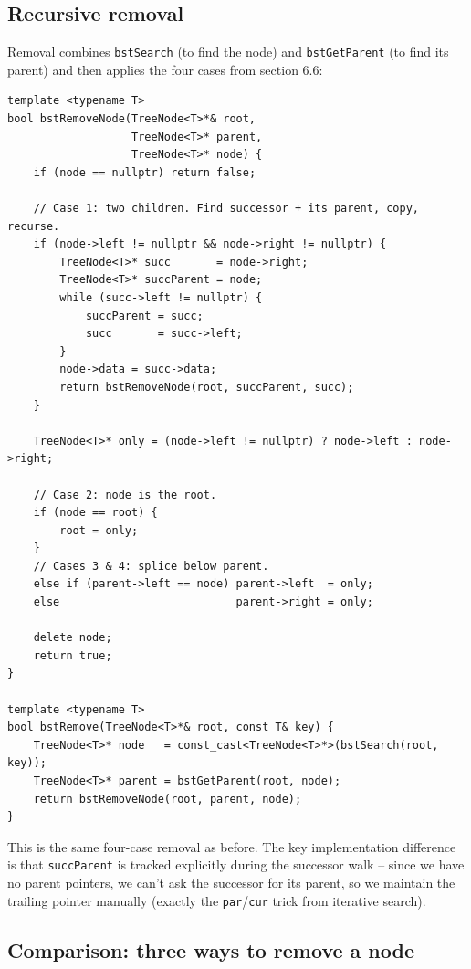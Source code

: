 \documentclass[11pt]{article}
\begin{document}
\subsection*{Recursive removal}

Removal combines \texttt{bstSearch} (to find the node) and \texttt{bstGetParent} (to find its parent) and then applies the four cases from section 6.6:

\begin{lstlisting}
template <typename T>
bool bstRemoveNode(TreeNode<T>*& root,
                   TreeNode<T>* parent,
                   TreeNode<T>* node) {
    if (node == nullptr) return false;

    // Case 1: two children. Find successor + its parent, copy, recurse.
    if (node->left != nullptr && node->right != nullptr) {
        TreeNode<T>* succ       = node->right;
        TreeNode<T>* succParent = node;
        while (succ->left != nullptr) {
            succParent = succ;
            succ       = succ->left;
        }
        node->data = succ->data;
        return bstRemoveNode(root, succParent, succ);
    }

    TreeNode<T>* only = (node->left != nullptr) ? node->left : node->right;

    // Case 2: node is the root.
    if (node == root) {
        root = only;
    }
    // Cases 3 & 4: splice below parent.
    else if (parent->left == node) parent->left  = only;
    else                           parent->right = only;

    delete node;
    return true;
}

template <typename T>
bool bstRemove(TreeNode<T>*& root, const T& key) {
    TreeNode<T>* node   = const_cast<TreeNode<T>*>(bstSearch(root, key));
    TreeNode<T>* parent = bstGetParent(root, node);
    return bstRemoveNode(root, parent, node);
}
\end{lstlisting}

This is the same four-case removal as before. The key implementation difference is that \texttt{succParent} is tracked explicitly during the successor walk -- since we have no parent pointers, we can't ask the successor for its parent, so we maintain the trailing pointer manually (exactly the \texttt{par}/\texttt{cur} trick from iterative search).

\subsection*{Comparison: three ways to remove a node}
\end{document}
